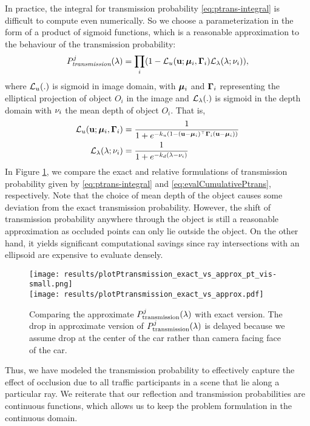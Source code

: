 In practice, the integral for transmission probability \eqref{eq:ptrans-integral} is difficult to compute even numerically. So we choose a parameterization in the form of a product of sigmoid functions, which is a reasonable approximation to the behaviour of the transmission probability:
%
\newcommand{\Ptransmission}{P_{\textit{transmission}}}%
\begin{align}
  \Ptransmission^j(\lambda) = \prod_i (1 - \cL_u (\bu; \bmu_i, \bGamma_i) \cL_{\lambda}(\lambda; \meandepth{i})),
\label{eq:evalCumulativePtrans}
\end{align}
%
where $\mathcal{L}_u(.)$ is sigmoid in image domain, with ${\bm{\mu}}_i$ and $\bm{\Gamma}_i$ representing the elliptical projection of object $O_i$ in the image and $\mathcal{L}_{\lambda}(.)$ is sigmoid in the depth domain with $\nu_i$ the mean depth of object $O_i$. That is,
%
\begin{align}
\mathcal{L}_u(\mathbf{u}; {\bm{\mu}}_i, \bm{\Gamma}_i) &= \frac{1}{1 + e^{-k_u(1 - (\mathbf{u} - {\bm{\mu}}_i)^\top \bm{\Gamma}_i (\mathbf{u} - {\bm{\mu}}_i))}} \\
  \mathcal{L}_{\lambda}(\lambda; \nu_i) &= \frac{1}{1 + e^{-k_d(\lambda - \nu_i)}}
\end{align}
%
In Figure \ref{fig:compare:exact:approx:ptrans}, we compare the exact and relative formulations of transmission probability given by \eqref{eq:ptrans-integral} and \eqref{eq:evalCumulativePtrans}, respectively. Note that the choice of mean depth of the object causes some deviation from the exact transmission probability. However, the shift of transmission probability anywhere through the object is still a reasonable approximation as occluded points can only lie outside the object. On the other hand, it yields significant computational savings since ray intersections with an ellipsoid are expensive to evaluate densely.


\begin{figure}
\centering
  \texttt{[image: results/plotPtransmission\_exact\_vs\_approx\_pt\_vis-small.png]}\\
  \texttt{[image: results/plotPtransmission\_exact\_vs\_approx.pdf]}
  \vspace{-0.3cm}
  \caption{\small Comparing the approximate $P^{j}_{\text{transmission}}(\lambda)$ with exact version. The drop in approximate version of $P^{j}_{\text{transmission}}(\lambda)$ is delayed because we assume drop at the center of the car rather than camera facing face of the car.}
  \label{fig:compare:exact:approx:ptrans}
  \vspace{-0.3cm}
\end{figure}

Thus, we have modeled the transmission probability to effectively capture the effect of occlusion due to all traffic participants in a scene that lie along a particular ray. We reiterate that our reflection and transmission probabilities are continuous functions, which allows us to keep the problem formulation in the continuous domain.
